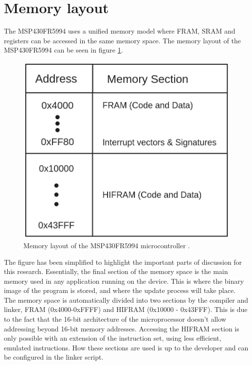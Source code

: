 \section{Memory layout}\label{sec:memory_layout}
The MSP430FR5994 uses a unified memory model where FRAM, SRAM and registers can be accessed in the same memory space. The memory layout of the MSP430FR5994 can be seen in figure \ref{fig:memory_layout}.
\begin{figure}[!ht]
    \begin{shaded}
    \centering
    \includegraphics[width=\figurewidth]{img/mem_layout.png}
    \caption{Memory layout of the MSP430FR5994 microcontroller \cite{fr5994DataSheet}.}
    \label{fig:memory_layout}
\end{shaded}
\end{figure}

The figure has been simplified to highlight the important parts of discussion for this research. Essentially, the final section of the memory space is the main memory used in any application running on the device. This is where the binary image of the program is stored, and where the update process will take place. The memory space is automatically divided into two sections by the compiler and linker, FRAM (0x4000-0xFFFF) and HIFRAM (0x10000 - 0x43FFF). This is due to the fact that the 16-bit architecture of the microprocessor doesn't allow addressing beyond 16-bit memory addresses. Accessing the HIFRAM section is only possible with an extension of the instruction set, using less efficient, emulated instructions. How these sections are used is up to the developer and can be configured in the linker script. 


